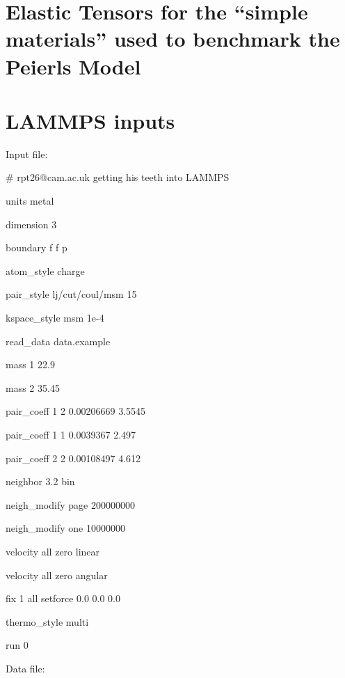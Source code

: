 \section{Elastic Tensors for the ``simple materials'' used to benchmark the Peierls Model}



\section{LAMMPS inputs}
\label{sec:lammps_input}


Input file:
\par\bigskip
\begin{tt}
\# rpt26@cam.ac.uk getting his teeth into LAMMPS
\par\bigskip
units metal


dimension 3


boundary f f p


atom\_style charge


pair\_style lj/cut/coul/msm 15


kspace\_style msm 1e-4


read\_data data.example


mass 1 22.9

mass 2 35.45

pair\_coeff 1 2 0.00206669 3.5545

pair\_coeff 1 1 0.0039367 2.497

pair\_coeff 2 2 0.00108497 4.612

neighbor 3.2 bin

neigh\_modify page 200000000

neigh\_modify one 10000000

velocity all zero linear

velocity all zero angular

fix 1 all setforce 0.0 0.0 0.0  

thermo\_style multi

run 0\end{tt}
\par\bigskip


\noindent
Data file:
\par\bigskip

